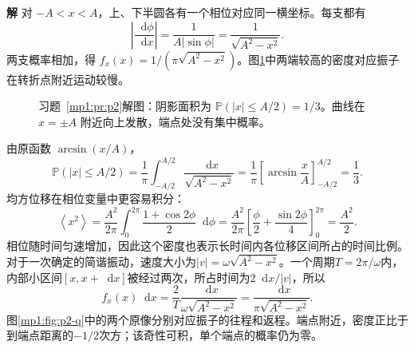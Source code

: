 \documentclass[11pt,openany,fontset=fandol]{ctexbook}
\theoremstyle{definition}\newtheorem{example}{例}[chapter]\newtheorem{exercise}{习题}[chapter]
\newcommand{\SolutionStart}{\par\medskip\ifdim\pagetotal>0pt\ifdim\dimexpr\pagegoal-\pagetotal\relax<3\baselineskip\newpage\fi\fi\noindent\textbf{解}\quad\ignorespaces}
\newenvironment{solution}{\SolutionStart}{\par\medskip}
\newcommand{\dd}{\mathop{}\!\mathrm d}\newcommand{\ee}{\mathrm e}\newcommand{\vct}[1]{\bm{#1}}
\newcommand{\Prob}{\mathbb P}\newcommand{\avg}[1]{\left\langle#1\right\rangle}
\begin{document}
\begin{solution}
对 $-A<x<A$，上、下半圆各有一个相位对应同一横坐标。每支都有
\[
\left|\frac{\dd\phi}{\dd x}\right|
=\frac1{A|\sin\phi|}=\frac1{\sqrt{A^2-x^2}}.
\]
两支概率相加，得 $f_x(x)=1/(\pi\sqrt{A^2-x^2})$。图\ref{mp1:fig:p2-s}中两端较高的密度对应振子在转折点附近运动较慢。

\begin{figure}[H]\centering

\caption{习题~\ref{mp1:pr:p2}解图：阴影面积为 $\Prob(|x|\le A/2)=1/3$。曲线在 $x=\pm A$ 附近向上发散，端点处没有集中概率。}\label{mp1:fig:p2-s}
\end{figure}

由原函数 $\arcsin(x/A)$，
\[
\Prob(|x|\le A/2)=\frac1\pi\int_{-A/2}^{A/2}\frac{\dd x}{\sqrt{A^2-x^2}}
=\frac1\pi\left[\arcsin\frac xA\right]_{-A/2}^{A/2}
=\frac13.
\]
均方位移在相位变量中更容易积分：
\[
\avg{x^2}=\frac{A^2}{2\pi}\int_0^{2\pi}\frac{1+\cos2\phi}{2}\dd\phi
=\frac{A^2}{2\pi}\left[\frac\phi2+\frac{\sin2\phi}{4}\right]_0^{2\pi}
=\frac{A^2}{2}.
\]
相位随时间匀速增加，因此这个密度也表示长时间内各位移区间所占的时间比例。
对于一次确定的简谐振动，速度大小为$|v|=\omega\sqrt{A^2-x^2}$。一个周期$T=2\pi/\omega$内，内部小区间$[x,x+\dd x]$被经过两次，所占时间为$2\dd x/|v|$，所以
\[
 f_x(x)\dd x=\frac{2}{T}\frac{\dd x}{\omega\sqrt{A^2-x^2}}
 =\frac{\dd x}{\pi\sqrt{A^2-x^2}}.
\]
图\ref{mp1:fig:p2-q}中的两个原像分别对应振子的往程和返程。端点附近，密度正比于到端点距离的$-1/2$次方；该奇性可积，单个端点的概率仍为零。
\end{solution}
\end{document}
